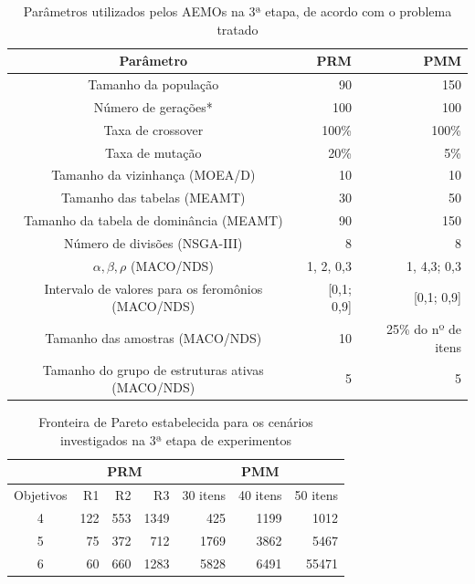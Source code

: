 \begin{table}[!htbp]
	\caption{Parâmetros utilizados pelos AEMOs na 3ª etapa, de acordo com o problema tratado}
	\label{table_exp3_parametros}
	\begin{center}
		\begin{tabular}{c|r|r}
			\textbf{Parâmetro} & \textbf{PRM} &  \textbf{PMM} \\ %
			\hline
			Tamanho da população               &    90 &      150 \\ %
			Número de gerações*        &   100 &      100 \\ %
			Taxa de crossover                & 100\% &    100\% \\ %
			Taxa de mutação                 &  20\% &      5\% \\ %
			Tamanho da vizinhança (MOEA/D)    &    10 &       10 \\ %
			Tamanho das tabelas (MEAMT)   &    30 &       50 \\ %
			Tamanho da tabela de dominância (MEAMT) &    90 &      150 \\ %
			Número de divisões (NSGA-III)&     8 &        8 \\ %
			$\alpha, \beta, \rho$ (MACO/NDS)& 1, 2, 0,3 & 1, 4,3; 0,3 \\ %
			Intervalo de valores para os feromônios (MACO/NDS)& [0,1; 0,9] & [0,1; 0,9] \\ %
			Tamanho das amostras (MACO/NDS)& 10 &25\% do nº de itens \\  %
			Tamanho do grupo de estruturas ativas (MACO/NDS)& 5 & 5 \\
			\hline
		\end{tabular}
	\end{center}
\end{table}

\begin{table}[!htbp]
	\centering
	\caption{Fronteira de Pareto estabelecida para os cenários investigados na 3ª etapa de experimentos}
	\label{table_exp3_paretos}
	\begin{tabular}{c|rrr|rrr}
		& \multicolumn{3}{c|}{\textbf{PRM}} & \multicolumn{3}{c}{\textbf{PMM}} \\ \hline
		Objetivos & R1         & R2       & R3        & 30 itens  & 40 itens & 50 itens \\ \hline
		4         & 122        & 553       & 1349        & 425       & 1199      & 1012    \\
		5         & 75        & 372      & 712       & 1769      & 3862     & 5467   \\
		6         & 60       & 660      & 1283      & 5828      & 6491   & 55471   \\ \hline
	\end{tabular}
\end{table}

